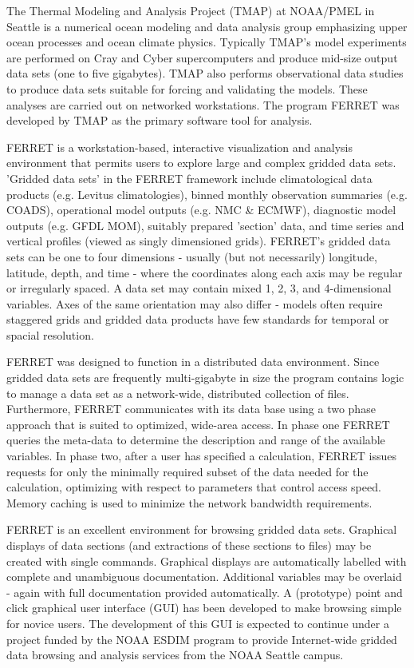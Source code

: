 \medskip
\large
{}
\normalsize
\medskip

	The Thermal Modeling and Analysis Project (TMAP) at NOAA/PMEL in 
Seattle is a numerical ocean modeling and data analysis group 
emphasizing upper ocean processes and ocean climate physics.  Typically 
TMAP's model experiments are performed on Cray and Cyber 
supercomputers and produce mid-size output data sets (one to five 
gigabytes).  TMAP also performs observational data studies to produce 
data sets suitable for forcing and validating the models.  These analyses 
are carried out on networked workstations.  The program FERRET was 
developed by TMAP as the primary software tool for analysis.

	FERRET is a workstation-based, interactive visualization and 
analysis environment that permits users to explore large and complex 
gridded data sets.  'Gridded data sets' in the FERRET framework include 
climatological data products (e.g. Levitus climatologies), binned monthly 
observation summaries (e.g. COADS), operational model outputs (e.g. NMC \& 
ECMWF), diagnostic model outputs (e.g. GFDL MOM), suitably prepared 
'section' data, and time series and vertical profiles (viewed as singly 
dimensioned grids).  FERRET's gridded data sets can be one to four 
dimensions - usually (but not necessarily) longitude, latitude, depth, and 
time - where the coordinates along each axis may be regular or irregularly 
spaced.  A data set may contain mixed 1, 2, 3, and 4-dimensional 
variables.  Axes of the same orientation may also differ - models often 
require staggered grids and gridded data products have few standards for 
temporal or spacial resolution.

	FERRET was designed to function in a distributed data environment.  
Since gridded data sets are frequently multi-gigabyte in size the program 
contains logic to manage a data set as a network-wide, distributed 
collection of files.  Furthermore, FERRET communicates with its data base 
using a two phase approach that is suited to optimized, wide-area access.  
In phase one FERRET queries the meta-data to determine the description 
and range of the available variables.  In phase two, after a user has 
specified a calculation, FERRET issues requests for only the minimally 
required subset of the data needed for the calculation, optimizing with 
respect to parameters that control access speed.  Memory caching is used 
to minimize the network bandwidth requirements. 

	FERRET is an excellent environment for browsing gridded data sets.  
Graphical displays of data sections (and extractions of these sections to 
files) may be created with single commands.  Graphical displays are 
automatically labelled with complete and unambiguous documentation.  
Additional variables may be overlaid - again with full documentation 
provided automatically.  A (prototype) point and click graphical user 
interface (GUI) has been developed to make browsing simple for novice 
users.  The development of this GUI is expected to continue under a project 
funded by the NOAA ESDIM program to provide Internet-wide gridded data 
browsing and analysis services from the NOAA Seattle campus. 

